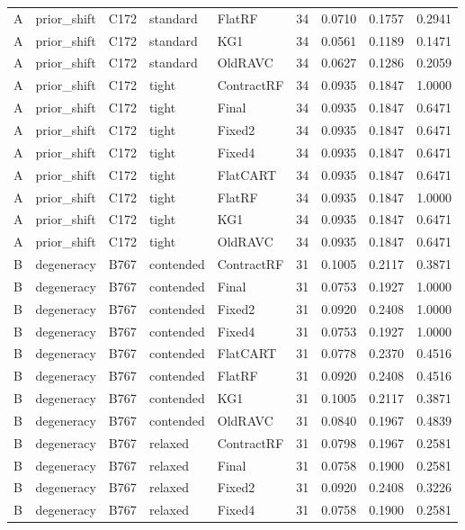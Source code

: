 \begin{longtable}{@{}lllllllll@{}}
A & prior\_shift & C172 & standard & FlatRF & 34 & 0.0710 & 0.1757 & 0.2941\\
A & prior\_shift & C172 & standard & KG1 & 34 & 0.0561 & 0.1189 & 0.1471\\
A & prior\_shift & C172 & standard & OldRAVC & 34 & 0.0627 & 0.1286 & 0.2059\\
A & prior\_shift & C172 & tight & ContractRF & 34 & 0.0935 & 0.1847 & 1.0000\\
A & prior\_shift & C172 & tight & Final & 34 & 0.0935 & 0.1847 & 0.6471\\
A & prior\_shift & C172 & tight & Fixed2 & 34 & 0.0935 & 0.1847 & 0.6471\\
A & prior\_shift & C172 & tight & Fixed4 & 34 & 0.0935 & 0.1847 & 0.6471\\
A & prior\_shift & C172 & tight & FlatCART & 34 & 0.0935 & 0.1847 & 0.6471\\
A & prior\_shift & C172 & tight & FlatRF & 34 & 0.0935 & 0.1847 & 1.0000\\
A & prior\_shift & C172 & tight & KG1 & 34 & 0.0935 & 0.1847 & 0.6471\\
A & prior\_shift & C172 & tight & OldRAVC & 34 & 0.0935 & 0.1847 & 0.6471\\
B & degeneracy & B767 & contended & ContractRF & 31 & 0.1005 & 0.2117 & 0.3871\\
B & degeneracy & B767 & contended & Final & 31 & 0.0753 & 0.1927 & 1.0000\\
B & degeneracy & B767 & contended & Fixed2 & 31 & 0.0920 & 0.2408 & 1.0000\\
B & degeneracy & B767 & contended & Fixed4 & 31 & 0.0753 & 0.1927 & 1.0000\\
B & degeneracy & B767 & contended & FlatCART & 31 & 0.0778 & 0.2370 & 0.4516\\
B & degeneracy & B767 & contended & FlatRF & 31 & 0.0920 & 0.2408 & 0.4516\\
B & degeneracy & B767 & contended & KG1 & 31 & 0.1005 & 0.2117 & 0.3871\\
B & degeneracy & B767 & contended & OldRAVC & 31 & 0.0840 & 0.1967 & 0.4839\\
B & degeneracy & B767 & relaxed & ContractRF & 31 & 0.0798 & 0.1967 & 0.2581\\
B & degeneracy & B767 & relaxed & Final & 31 & 0.0758 & 0.1900 & 0.2581\\
B & degeneracy & B767 & relaxed & Fixed2 & 31 & 0.0920 & 0.2408 & 0.3226\\
B & degeneracy & B767 & relaxed & Fixed4 & 31 & 0.0758 & 0.1900 & 0.2581\\

\end{longtable}
